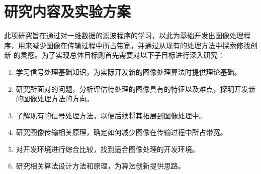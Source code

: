 %
%
%
%

\section{研究内容及实验方案}

此项研究旨在通过对一维数据的滤波程序的学习，以此为基础开发出图像处理程序，用来减少图像在传输过程中所占带宽，并通过从现有的处理方法中探索修找创新
的灵感。为了实现总体目标则首先需要对以下子目标进行深入研究：
\begin{enumerate}[label=\arabic*)]
    \item 学习信号处理基础知识，为实际开发新的图像处理算法时提供理论基础。
    \item 研究所面对的问题，分析评估待处理的图像具有的特征以及难点，探明开发新的图像处理方法的方向。
    \item 了解现有的信号处理方法，以便后续将其拓展到图像处理中。
    \item 研究图像传输相关原理，确定如何减少图像在传输过程中所占带宽。
    \item 对开发环境进行综合比较，找到适合图像处理的开发环境。
    \item 研究相关算法设计方法和原理，为算法创新提供思路。
\end{enumerate}



